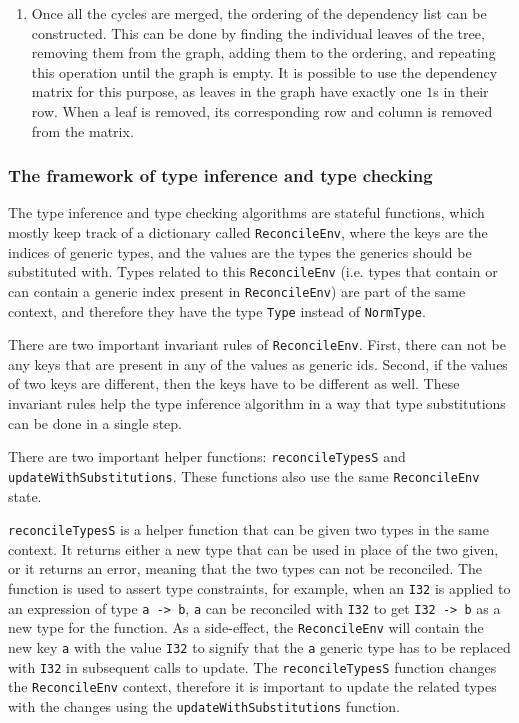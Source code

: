 \documentclass[12pt]{article}
\begin{document}
\begin{enumerate}
\item Once all the cycles are merged, the ordering of the dependency list can be
    constructed. This can be done by finding the individual leaves of the tree,
    removing them from the graph, adding them to the ordering, and repeating
    this operation until the graph is empty. It is possible to use the
    dependency matrix for this purpose, as leaves in the graph have exactly
    one $1$s in their row. When a leaf is removed, its corresponding row and
    column is removed from the matrix.
\end{enumerate}

\subsubsection{The framework of type inference and type checking}

The type inference and type checking algorithms are stateful functions, which
mostly keep track of a dictionary called \verb$ReconcileEnv$, where the keys are
the indices of generic types, and the values are the types the generics should
be substituted with. Types related to this \verb$ReconcileEnv$ (i.e. types that
contain or can contain a generic index present in \verb$ReconcileEnv$) are part
of the same context, and therefore they have the type \verb$Type$ instead of
\verb$NormType$. 

There are two important invariant rules of \verb$ReconcileEnv$. First, there can
not be any keys that are present in any of the values as generic ids. Second,
if the values of two keys are different, then the keys have to be different as
well. These invariant rules help the type inference algorithm in a way that type
substitutions can be done in a single step.

There are two important helper functions:
\verb$reconcileTypesS$ and \\\verb$updateWithSubstitutions$. These functions
also use the same \verb$ReconcileEnv$ state.

\verb$reconcileTypesS$ is a helper function that can be given two types in the
same context. It returns either a new type that can be used in place of the two
given, or it returns an error, meaning that the two types can not be reconciled.
The function is used to assert type constraints, for example, when an \verb$I32$
is applied to an expression of type \verb$a -> b$, \verb$a$ can be reconciled
with \verb$I32$ to get \verb$I32 -> b$ as a new type for the function. As a
side-effect, the \verb$ReconcileEnv$ will contain the new key \verb$a$ with the
value \verb$I32$ to signify that the \verb$a$ generic type has to be replaced
with \verb$I32$ in subsequent calls to update. The \verb$reconcileTypesS$
function changes the \verb$ReconcileEnv$ context, therefore it is important to
update the related types with the changes using the
\verb$updateWithSubstitutions$ function.
\end{document}
